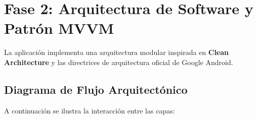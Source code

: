 \documentclass[12pt,a4paper]{article}
\begin{document}
\section{Fase 2: Arquitectura de Software y Patrón MVVM}

La aplicación implementa una arquitectura modular inspirada en \textbf{Clean Architecture} y las directrices de arquitectura oficial de Google Android.

\subsection{Diagrama de Flujo Arquitectónico}
A continuación se ilustra la interacción entre las capas:
\end{document}
